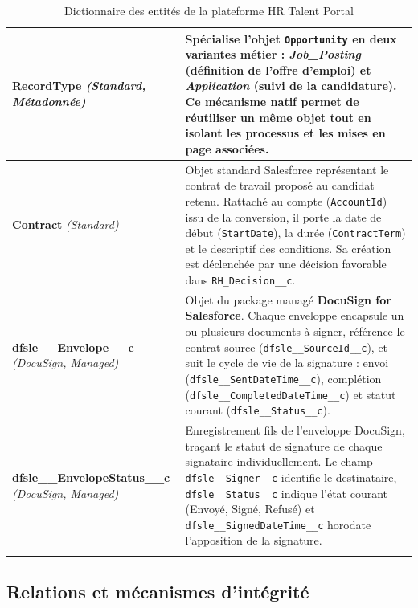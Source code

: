 \begin{longtable}{|p{4.2cm}|p{10.8cm}|}
\textbf{RecordType} \newline\textit{(Standard, Métadonnée)} & Spécialise l'objet \texttt{Opportunity} en deux variantes métier : \textit{Job\_Posting} (définition de l'offre d'emploi) et \textit{Application} (suivi de la candidature). Ce mécanisme natif permet de réutiliser un même objet tout en isolant les processus et les mises en page associées. \\
\hline

\textbf{Contract} \newline\textit{(Standard)} & Objet standard Salesforce représentant le contrat de travail proposé au candidat retenu. Rattaché au compte (\texttt{AccountId}) issu de la conversion, il porte la date de début (\texttt{StartDate}), la durée (\texttt{ContractTerm}) et le descriptif des conditions. Sa création est déclenchée par une décision favorable dans \texttt{RH\_Decision\_\_c}. \\
\hline

\textbf{dfsle\_\_Envelope\_\_c} \newline\textit{(DocuSign, Managed)} & Objet du package managé \textbf{DocuSign for Salesforce}. Chaque enveloppe encapsule un ou plusieurs documents à signer, référence le contrat source (\texttt{dfsle\_\_SourceId\_\_c}), et suit le cycle de vie de la signature : envoi (\texttt{dfsle\_\_SentDateTime\_\_c}), complétion (\texttt{dfsle\_\_CompletedDateTime\_\_c}) et statut courant (\texttt{dfsle\_\_Status\_\_c}). \\
\hline

\textbf{dfsle\_\_EnvelopeStatus\_\_c} \newline\textit{(DocuSign, Managed)} & Enregistrement fils de l'enveloppe DocuSign, traçant le statut de signature de chaque signataire individuellement. Le champ \texttt{dfsle\_\_Signer\_\_c} identifie le destinataire, \texttt{dfsle\_\_Status\_\_c} indique l'état courant (Envoyé, Signé, Refusé) et \texttt{dfsle\_\_SignedDateTime\_\_c} horodate l'apposition de la signature. \\

\caption{Dictionnaire des entités de la plateforme HR Talent Portal}
\label{table:objets_rh}
\end{longtable}

\FloatBarrier

\subsection{Relations et mécanismes d'intégrité}

